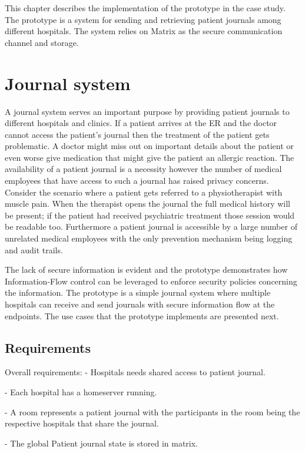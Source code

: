 This chapter describes the implementation of the prototype in the case study. The prototype is a system for sending and retrieving patient journals among different hospitals. The system relies on Matrix as the secure communication channel and storage.

\section{Journal system}

A journal system serves an important purpose by providing patient journals to different hospitals and clinics. If a patient arrives at the ER and the doctor cannot access the patient's journal then the treatment of the patient gets problematic. A doctor might miss out on important details about the patient or even worse give medication that might give the patient an allergic reaction. The availability of a patient journal is a necessity however the number of medical employees that have access to such a journal has raised privacy concerns. Consider the scenario where a patient gets referred to a physiotherapist with muscle pain. When the therapist opens the journal the full medical history will be present; if the patient had received psychiatric treatment those session would be readable too. Furthermore a patient journal is accessible by a large number of unrelated medical employees with the only prevention mechanism being logging and audit trails.


The lack of secure information is evident and the prototype demonstrates how Information-Flow control can be leveraged to enforce security policies concerning the information. The prototype is a simple journal system where multiple hospitals can receive and send journals with secure information flow at the endpoints. The use cases that the prototype implements are presented next.

\subsection{Requirements}

Overall requirements:
- Hospitals needs shared access to patient journal. 

- Each hospital has a homeserver running.

- A room represents a patient journal with the participants in the room being the respective hospitals that share the journal. 

- The global Patient journal state is stored in matrix.

